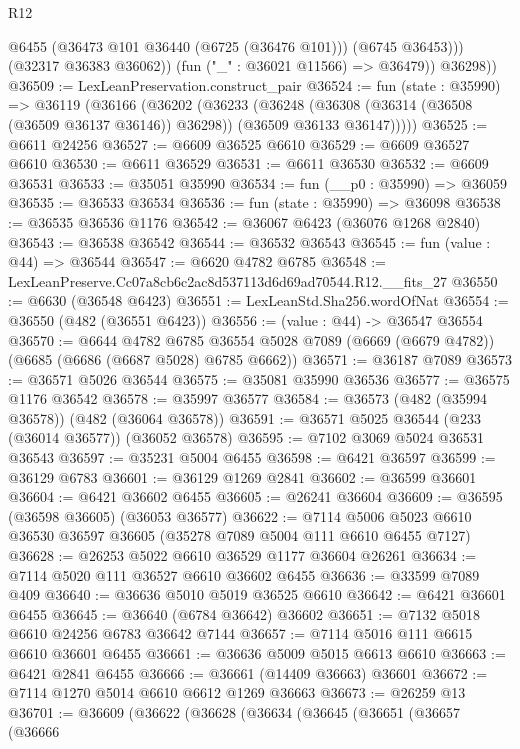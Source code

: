 \begin{lexlean}{R12}
\begin{coremodule}
                @6455
                (@36473 @101 @36440 (@6725 (@36476 @101)))
                (@6745 @36453)))
            (@32317 @36383 @36062))
          (fun ("_" : @36021 @11566) => @36479))
        @36298))
@36509 := LexLeanPreservation.construct_pair
@36524 := fun (state : @35990) =>
  @36119
    (@36166
      (@36202
        (@36233
          (@36248
            (@36308 (@36314 (@36508 (@36509 @36137 @36146)) @36298))
            (@36509 @36133 @36147)))))
@36525 := @6611 @24256
@36527 := @6609 @36525 @6610
@36529 := @6609 @36527 @6610
@36530 := @6611 @36529
@36531 := @6611 @36530
@36532 := @6609 @36531
@36533 := @35051 @35990
@36534 := fun (__p0 : @35990) => @36059
@36535 := @36533 @36534
@36536 := fun (state : @35990) => @36098
@36538 := @36535 @36536 @1176
@36542 := @36067 @6423 (@36076 @1268 @2840)
@36543 := @36538 @36542
@36544 := @36532 @36543
@36545 := fun (value : @44) => @36544
@36547 := @6620 @4782 @6785
@36548 := LexLeanPreserve.Cc07a8cb6c2ac8d537113d6d69ad70544.R12.__fits_27
@36550 := @6630 (@36548 @6423)
@36551 := LexLeanStd.Sha256.wordOfNat
@36554 := @36550 (@482 (@36551 @6423))
@36556 := (value : @44) -> @36547 @36554
@36570 := @6644
    @4782
    @6785
    @36554
    @5028
    @7089
    (@6669 (@6679 @4782))
    (@6685 (@6686 (@6687 @5028) @6785 @6662))
@36571 := @36187 @7089
@36573 := @36571 @5026 @36544
@36575 := @35081 @35990 @36536
@36577 := @36575 @1176 @36542
@36578 := @35997 @36577
@36584 := @36573 (@482 (@35994 @36578)) (@482 (@36064 @36578))
@36591 := @36571 @5025 @36544 (@233 (@36014 @36577)) (@36052 @36578)
@36595 := @7102 @3069 @5024 @36531 @36543
@36597 := @35231 @5004 @6455
@36598 := @6421 @36597
@36599 := @36129 @6783
@36601 := @36129 @1269 @2841
@36602 := @36599 @36601
@36604 := @6421 @36602 @6455
@36605 := @26241 @36604
@36609 := @36595 (@36598 @36605) (@36053 @36577)
@36622 := @7114 @5006 @5023 @6610 @36530 @36597 @36605 (@35278 @7089 @5004 @111 @6610 @6455 @7127)
@36628 := @26253 @5022 @6610 @36529 @1177 @36604 @26261
@36634 := @7114 @5020 @111 @36527 @6610 @36602 @6455
@36636 := @33599 @7089 @409
@36640 := @36636 @5010 @5019 @36525 @6610
@36642 := @6421 @36601 @6455
@36645 := @36640 (@6784 @36642) @36602
@36651 := @7132 @5018 @6610 @24256 @6783 @36642 @7144
@36657 := @7114 @5016 @111 @6615 @6610 @36601 @6455
@36661 := @36636 @5009 @5015 @6613 @6610
@36663 := @6421 @2841 @6455
@36666 := @36661 (@14409 @36663) @36601
@36672 := @7114 @1270 @5014 @6610 @6612 @1269 @36663
@36673 := @26259 @13
@36701 := @36609
    (@36622
      (@36628
        (@36634
          (@36645
            (@36651
              (@36657
                (@36666

\end{coremodule}
\end{lexlean}
